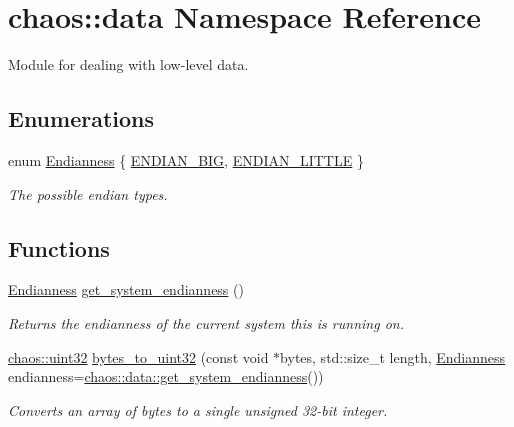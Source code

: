 \hypertarget{namespacechaos_1_1data}{\section{chaos\-:\-:data Namespace Reference}
\label{namespacechaos_1_1data}
}


Module for dealing with low-\/level data.  


\subsection*{Enumerations}
\begin{DoxyCompactItemize}
\item 
enum \hyperlink{namespacechaos_1_1data_adb2657d50c0b84cdc1153001031bbf3f}{Endianness} \{ \hyperlink{namespacechaos_1_1data_adb2657d50c0b84cdc1153001031bbf3fa0e1ed99b965cedefe24534be309738ad}{E\-N\-D\-I\-A\-N\-\_\-\-B\-I\-G}, 
\hyperlink{namespacechaos_1_1data_adb2657d50c0b84cdc1153001031bbf3fa7fc5455bb6147c278dfa4a84e255c66d}{E\-N\-D\-I\-A\-N\-\_\-\-L\-I\-T\-T\-L\-E}
 \}
\begin{DoxyCompactList}\small\item\em The possible endian types. \end{DoxyCompactList}\end{DoxyCompactItemize}
\subsection*{Functions}
\begin{DoxyCompactItemize}
\item 
\hypertarget{namespacechaos_1_1data_a853118d28d026784faad6673bbcf526f}{\hyperlink{namespacechaos_1_1data_adb2657d50c0b84cdc1153001031bbf3f}{Endianness} \hyperlink{namespacechaos_1_1data_a853118d28d026784faad6673bbcf526f}{get\-\_\-system\-\_\-endianness} ()}\label{namespacechaos_1_1data_a853118d28d026784faad6673bbcf526f}

\begin{DoxyCompactList}\small\item\em Returns the endianness of the current system this is running on. \end{DoxyCompactList}\item 
\hyperlink{namespacechaos_a8641b3ae4551f0b35570d4f9f4ec22d9}{chaos\-::uint32} \hyperlink{namespacechaos_1_1data_af4310ad815f14c278c83c5abb3abc251}{bytes\-\_\-to\-\_\-uint32} (const void $\ast$bytes, std\-::size\-\_\-t length, \hyperlink{namespacechaos_1_1data_adb2657d50c0b84cdc1153001031bbf3f}{Endianness} endianness=\hyperlink{namespacechaos_1_1data_a853118d28d026784faad6673bbcf526f}{chaos\-::data\-::get\-\_\-system\-\_\-endianness}())
\begin{DoxyCompactList}\small\item\em Converts an array of bytes to a single unsigned 32-\/bit integer. \end{DoxyCompactList}\end{DoxyCompactItemize}


